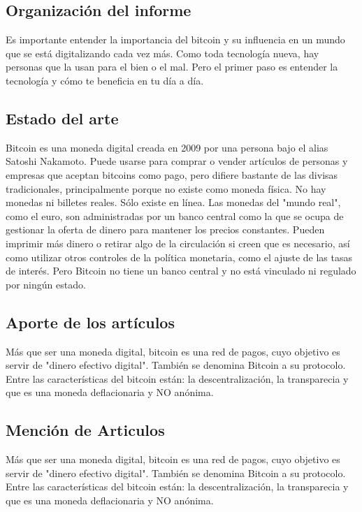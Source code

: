 \documentclass[10pt,twocolumn]{article}
\theoremstyle{definition}
\begin{document}
\subsection{Organización del informe}
Es importante entender la importancia del bitcoin y su influencia en un mundo que se está digitalizando cada vez más. Como toda tecnología nueva, hay personas que la usan para el bien o el mal. Pero el primer paso es entender la tecnología y cómo te beneficia en tu día a día.

\subsection{Estado del arte}
Bitcoin es una moneda digital creada en 2009 por una persona bajo el alias Satoshi Nakamoto. Puede usarse para comprar o vender artículos de personas y empresas que aceptan bitcoins como pago, pero difiere bastante de las divisas tradicionales, principalmente porque no existe como moneda física. No hay monedas ni billetes reales. Sólo existe en línea. Las monedas del "mundo real", como el euro, son administradas por un banco central como la que se ocupa de gestionar la oferta de dinero para mantener los precios constantes. Pueden imprimir más dinero o retirar algo de la circulación si creen que es necesario, así como utilizar otros controles de la política monetaria, como el ajuste de las tasas de interés. Pero Bitcoin no tiene un banco central y no está vinculado ni regulado por ningún estado.

\subsection{Aporte de los artículos }
Más que ser una moneda digital, bitcoin es una red de pagos, cuyo objetivo es servir de "dinero efectivo digital". También se denomina Bitcoin a su protocolo. Entre las características del bitcoin están: la descentralización, la transparecia y que es una moneda deflacionaria y NO anónima.

\subsection{Mención de Articulos}
Más que ser una moneda digital, bitcoin es una red de pagos, cuyo objetivo es servir de "dinero efectivo digital". También se denomina Bitcoin a su protocolo. Entre las características del bitcoin están: la descentralización, la transparecia y que es una moneda deflacionaria y NO anónima.
\end{document}
